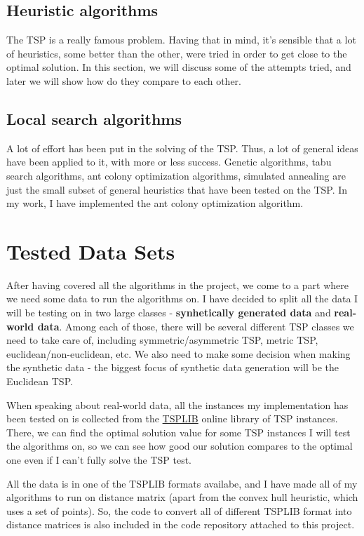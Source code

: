 \documentclass[12pt,twoside,notitlepage]{report}
\begin{document}
\subsection{Heuristic algorithms}

The TSP is a really famous problem. Having that in mind, it's sensible that a lot of heuristics, some better than the other, were tried in order to get close to the optimal solution. In this section, we will discuss some of the attempts tried, and later we will show how do they compare to each other.


\subsection{Local search algorithms}

A lot of effort has been put in the solving of the TSP. Thus, a lot of general ideas have been applied to it, with more or less success. Genetic algorithms, tabu search algorithms, ant colony optimization algorithms, simulated annealing are just the small subset of general heuristics that have been tested on the TSP. In my work, I have implemented the ant colony optimization algorithm.

\section{Tested Data Sets}

After having covered all the algorithms in the project, we come to a part where we need some data to run the algorithms on. I have decided to split all the data I will be testing on in two large classes - {\bf synhetically generated data} and {\bf real-world data}. Among each of those, there will be several different TSP classes we need to take care of, including symmetric/asymmetric TSP, metric TSP, euclidean/non-euclidean, etc. We also need to make some decision when making the synthetic data - the biggest focus of synthetic data generation will be the Euclidean TSP.

When speaking about real-world data, all the instances my implementation has been tested on is collected from the \hyperref[http://elib.zib.de/pub/mp-testdata/tsp/tsplib/tsplib.html]{TSPLIB} online library of TSP instances. There, we can find the optimal solution value for some TSP instances 
I will test the algorithms on, so we can see how good our solution compares to the optimal one even if I can't fully solve the TSP test.

All the data is in one of the TSPLIB formats availabe, and I have made all of my algorithms to run on distance matrix (apart from the convex hull heuristic, which uses a set of points). So, the code to convert all of different TSPLIB format into distance matrices is also included in the code repository attached to this project. 
\end{document}
